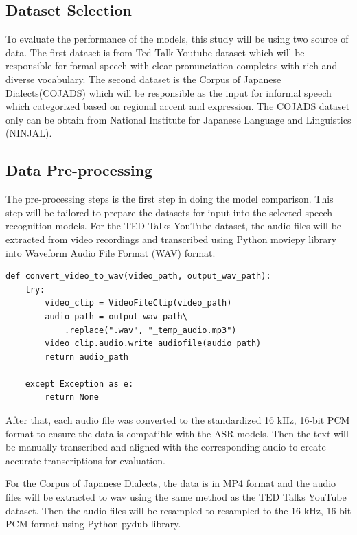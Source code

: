 \subsection{Dataset Selection}
To evaluate the performance of the models, this study will be using two source of data. The first dataset is from Ted Talk Youtube dataset which will be responsible for formal speech with clear pronunciation completes with rich and diverse vocabulary. The second dataset is the Corpus of Japanese Dialects(COJADS) which will be responsible as the input for informal speech which categorized based on regional accent and expression. The COJADS dataset only can be obtain from National Institute for Japanese Language and Linguistics (NINJAL).


\subsection{Data Pre-processing}
The pre-processing steps is the first step in doing the model comparison. This step will be tailored to prepare the datasets for input into the selected speech recognition models. For the TED Talks YouTube dataset, the audio files will be  extracted from video recordings and transcribed using Python moviepy library into Waveform Audio File Format (WAV) format. 
\begin{lstlisting}[caption={Python code to convert video to WAV format using moviepy}]
    def convert_video_to_wav(video_path, output_wav_path):
    try:
        video_clip = VideoFileClip(video_path)
        audio_path = output_wav_path\
            .replace(".wav", "_temp_audio.mp3")
        video_clip.audio.write_audiofile(audio_path)
        return audio_path
    
    except Exception as e:
        return None
\end{lstlisting}
After that, each audio file was converted to the standardized 16 kHz, 16-bit PCM format to ensure the data is compatible with the ASR models. Then the text will be manually transcribed and aligned with the corresponding audio to create accurate transcriptions for evaluation.

For the Corpus of Japanese Dialects, the data is in MP4 format and the audio files will be extracted to wav using the same method as the TED Talks YouTube dataset. Then the audio files will be resampled to resampled to the 16 kHz, 16-bit PCM format using Python pydub library.

